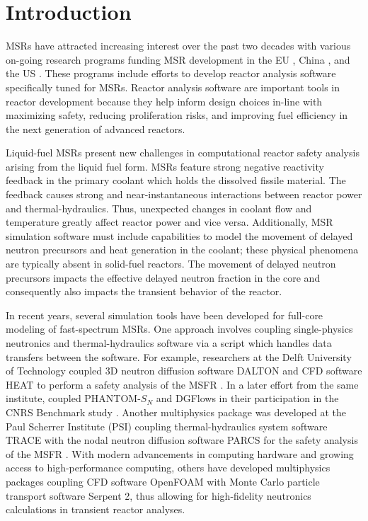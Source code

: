 \section{Introduction} \label{sec:intro}

\glspl{MSR} have attracted increasing interest over the past two
decades with various on-going research programs funding \gls{MSR} development
in the EU \citep{cordis_severe_nodate}, China \citep{dai_17_2017}, and the US
\citep{doe_office_2021}. These programs include efforts to develop
reactor analysis software specifically tuned for \glspl{MSR}. Reactor
analysis software are important tools in reactor development because
they help inform design choices in-line with
maximizing safety, reducing proliferation risks, and improving fuel
efficiency in the next generation of advanced reactors.

Liquid-fuel \glspl{MSR} present new challenges in computational reactor
safety analysis arising from the liquid fuel form. \glspl{MSR} feature strong
negative reactivity feedback in the primary coolant which holds the dissolved
fissile material. The feedback causes strong and near-instantaneous
interactions between reactor power and thermal-hydraulics. Thus,
unexpected changes in coolant flow and temperature greatly affect reactor
power and vice versa. Additionally, \gls{MSR} simulation software must include
capabilities to model the movement of delayed neutron precursors
and heat generation in the coolant; these physical phenomena are typically
absent in solid-fuel reactors. The movement of delayed neutron precursors
impacts the effective delayed neutron fraction in the core and consequently
also impacts the transient behavior of the reactor.

In recent years, several simulation tools have been developed for full-core
modeling of fast-spectrum \glspl{MSR}. One approach involves coupling
single-physics neutronics and thermal-hydraulics software via a script which
handles data transfers between the software. For example, researchers at
the Delft University of Technology coupled 3D neutron diffusion software
DALTON \citep{boer_validation_2010} and CFD software HEAT
\citep{de_zwaan_static_2007} to perform a safety analysis of the \gls{MSFR}
\citep{fiorina_modelling_2014}. In a later effort from the same institute,
\cite{tiberga_discontinuous_2019} coupled PHANTOM-$S_N$ and DGFlows
in their participation in the
CNRS Benchmark study \citep{tiberga_results_2020}. Another multiphysics
package was developed at the Paul Scherrer Institute (PSI) coupling
thermal-hydraulics system software TRACE \citep{nrc_trace_2007} with the nodal
neutron diffusion software PARCS \citep{downar_parcs_2010} for the safety
analysis of the \gls{MSFR} \citep{pettersen_coupled_2016}. With modern
advancements in computing hardware and growing access to high-performance
computing, others \citep{laureau_transient_2017,blanco_neutronic_2020} have
developed multiphysics packages coupling CFD software
OpenFOAM with Monte Carlo particle transport software Serpent 2, thus allowing
for high-fidelity neutronics calculations in transient reactor analyses.

